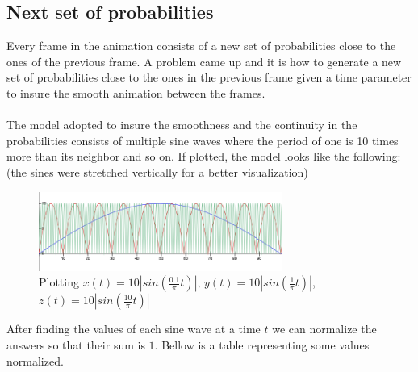 \documentclass[a4paper, 10pt]{article}
\begin{document}
        \subsection{Next set of probabilities}
        \label{sec:nextproba}
        Every frame in the animation consists of a new set of probabilities close to the ones of the
        previous frame. A problem came up and it is how to generate a new set of probabilities close
        to the ones in the previous frame given a time parameter to insure the smooth animation between the frames.\\\\
        The model adopted to insure the smoothness and the continuity in the probabilities consists
        of multiple sine waves where the period of one is 10 times more than its neighbor and so on.
        If plotted, the model looks like the following: (the sines were stretched vertically for a better
        visualization)
        \begin{figure}[hb]
            \centering
                \includegraphics[width=8cm]{graphics/sine_probabilities.png}
            \caption{Plotting
               $x(t) = 10\left| sin \left( \frac{0.1}{\pi}t \right) \right|$, 
               $y(t) = 10\left| sin \left( \frac{1}{\pi}t \right) \right|$, 
               $z(t) = 10\left| sin \left( \frac{10}{\pi}t \right) \right|$}
        \end{figure}
        After finding the values of each sine wave at a time $t$ we can normalize the answers so that
        their sum is $1$. Bellow is a table representing some values normalized.
\end{document}
